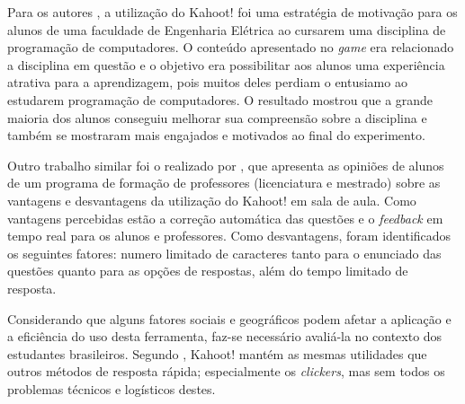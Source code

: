 Para os autores , a utilização do Kahoot! foi uma estratégia de motivação para os alunos de uma faculdade de Engenharia Elétrica ao cursarem uma disciplina de programação de computadores. O conteúdo apresentado no \textit{game} era relacionado a disciplina em questão e o objetivo era possibilitar aos alunos uma experiência atrativa para a aprendizagem, pois muitos deles perdiam o entusiamo ao estudarem programação de computadores. O resultado mostrou que a grande maioria dos alunos conseguiu melhorar sua  compreensão sobre a disciplina e também se mostraram mais engajados e motivados ao final do experimento.

Outro trabalho similar foi o realizado por , que apresenta as opiniões de alunos de um programa de formação de professores (licenciatura e mestrado) sobre as vantagens e desvantagens da utilização do Kahoot! em sala de aula. Como vantagens percebidas estão a correção automática das questões e o \textit{feedback} em tempo real para os alunos e professores. Como desvantagens, foram identificados os seguintes fatores: numero limitado de caracteres tanto para o enunciado das questões quanto para as opções de respostas, além do tempo limitado de resposta.

 Considerando que alguns fatores sociais e geográficos podem afetar a aplicação e a eficiência do uso desta ferramenta, faz-se necessário avaliá-la no contexto dos estudantes brasileiros. Segundo , Kahoot! mantém as mesmas utilidades que outros métodos de resposta rápida; especialmente os \textit{clickers}, mas sem todos os problemas técnicos e logísticos destes.

